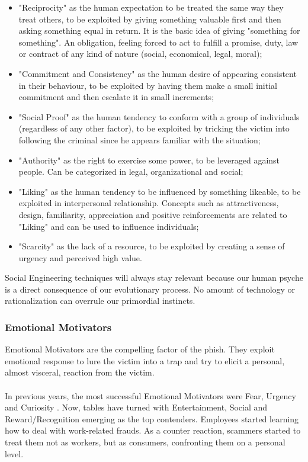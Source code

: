 \documentclass[a4paper]{article}
\begin{document}
\begin{itemize}
    \item "Reciprocity" as the human expectation to be treated the same way they treat others, to be exploited by giving something valuable first and then asking something equal in return. It is the basic idea of giving "something for something". An obligation, feeling forced to act to fulfill a promise, duty, law or contract of any kind of nature (social, economical, legal, moral);
    \item "Commitment and Consistency" as the human desire of appearing consistent in their behaviour, to be exploited by having them make a small initial commitment and then escalate it in small increments;
    \item "Social Proof" as the human tendency to conform with a group of individuals (regardless of any other factor), to be exploited by tricking the victim into following the criminal since he appears familiar with the situation;
    \item "Authority" as the right to exercise some power, to be leveraged against people. Can be categorized in legal, organizational and social;
    \item "Liking" as the human tendency to be influenced by something likeable, to be exploited in interpersonal relationship. Concepts such as attractiveness, design, familiarity, appreciation and positive reinforcements are related to "Liking" and can be used to influence individuals;
    \item "Scarcity" as the lack of a resource, to be exploited by creating a sense of urgency and perceived high value.
\end{itemize}

Social Engineering techniques will always stay relevant because our human psyche is a direct consequence of our evolutionary process. No amount of technology or rationalization can overrule our primordial instincts.

\subsubsection{Emotional Motivators}

Emotional Motivators are the compelling factor of the phish. They exploit emotional response to lure the victim into a trap and try to elicit a personal, almost visceral, reaction from the victim.
\\ \\
In previous years, the most successful Emotional Motivators were Fear, Urgency and Curiosity \cite{report-phishme}. Now, tables have turned with Entertainment, Social and Reward/Recognition emerging as the top contenders. Employees started learning how to deal with work-related frauds. As a counter reaction, scammers started to treat them not as workers, but as consumers, confronting them on a personal level.
\end{document}
